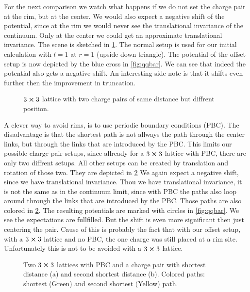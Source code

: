For the next comparison we watch what happens if we do not set the charge pair at the rim, but at the center. We would also expect a negative shift of the potential, since at the rim we would never see the translational invariance of the continuum. Only at the center we could get an approximate translational invariance. The scene is sketched in \cref{fig:3x3no}. The normal setup is used for our initial calculation with $l=1$ at $r=1$ (upside down triangle). The potential of the offset setup is now depicted by the blue cross in \cref{fig:qqbar}. We can see that indeed the potential also gets a negative shift. An interesting side note is that it shifts even further then the improvement in truncation.
\begin{figure}[h]
	\begin{center}
		
		\caption{$3\cross 3$ lattice with two charge pairs of same distance but diffrent position.}\label{fig:3x3no}
	\end{center}
\end{figure}

A clever way to avoid rims, is to use periodic boundary conditions (PBC). The disadvantage is that the shortest path is not allways the path through the center links, but through the links that are introduced by the PBC. This limits our possible charge pair setups, since allready for a $3 \cross 3$ lattice with PBC, there are only two diffrent setups. All other setups can be created by translation and rotation of those two. They are depicted in \cref{fig:3x3pbcv1}
We again expect a negative shift, since we have translational invariance. Thou we have translational invariance, it is not the same as in the continuum limit, since with PBC the paths also loop around through the links that are introduced by the PBC. Those paths are also colored in \cref{fig:3x3pbcv1}.
The resulting potentials are marked with circles in \cref{fig:qqbar}. We see the expectations are fullfilled. But the shift is even more significant then just centering the pair. Cause of this is probably the fact that with our offset setup, with a $3\cross 3$ lattice and no PBC, the one charge was still placed at a rim site. Unfortunately this is not to be avoided with a $3\cross 3$ lattice.
\begin{figure}[h]
	\begin{center}
		\subfloat[]{
			\scalebox{0.7}{
				
			}
		}
		\subfloat[]{
			\scalebox{0.7}{
				
			}
		}
		\caption{Two $3\cross3$ lattices with PBC and a charge pair with shortest distance (a) and second shortest distance (b). Colored paths: shortest (Green) and second shortest (Yellow) path.} \label{fig:3x3pbcv1}
	\end{center}
\end{figure}

